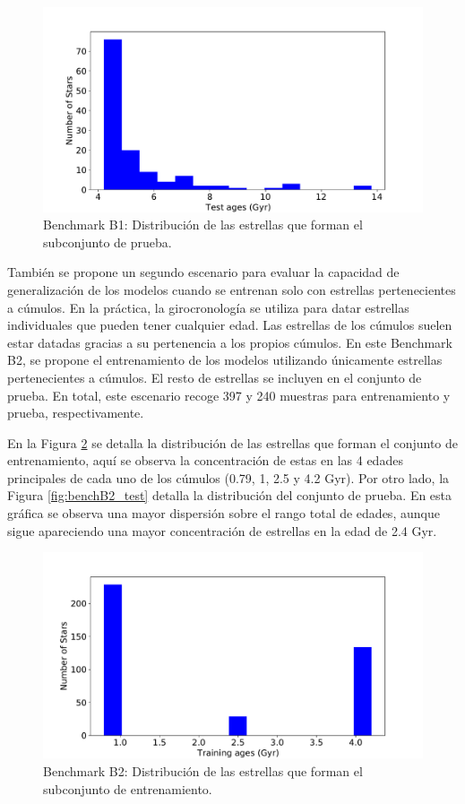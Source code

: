 \begin{figure}[H]
\begin{center}
 \includegraphics[width=0.8\linewidth]{Figuras/Experimentos/B_B1_test.pdf}
\end{center}
\caption{Benchmark B1: Distribución de las estrellas que forman el subconjunto de prueba.}
 \label{fig:benchB1_test}
\end{figure}

También se propone un segundo escenario para evaluar la capacidad de generalización de los modelos cuando se entrenan solo con estrellas pertenecientes a cúmulos. En la práctica, la girocronología se utiliza para datar estrellas individuales que pueden tener cualquier edad. Las estrellas de los cúmulos suelen estar datadas gracias a su pertenencia a los propios cúmulos. En este Benchmark B2, se propone el entrenamiento de los modelos utilizando únicamente estrellas pertenecientes a cúmulos. El resto de estrellas se incluyen en el conjunto de prueba. En total, este escenario recoge 397 y 240 muestras para entrenamiento y prueba, respectivamente.

En la Figura \ref{fig:benchB2_train} se detalla la distribución de las estrellas que forman el conjunto de entrenamiento, aquí se observa la concentración de estas en las 4 edades principales de cada uno de los cúmulos (0.79, 1, 2.5 y 4.2 Gyr).
Por otro lado, la Figura \ref{fig:benchB2_test} detalla la distribución del conjunto de prueba. En esta gráfica se observa una mayor dispersión sobre el rango total de edades, aunque sigue apareciendo una mayor concentración de estrellas en la edad de 2.4 Gyr. %

\begin{figure}[H]
\begin{center}
 \includegraphics[width=0.8\linewidth]{Figuras/Experimentos/B_B2_training.pdf}
\end{center}
\caption{Benchmark B2: Distribución de las estrellas que forman el subconjunto de entrenamiento.}
 \label{fig:benchB2_train}
\end{figure}

